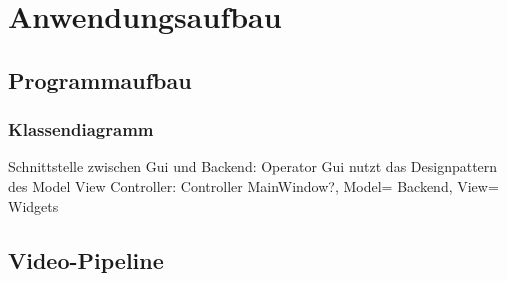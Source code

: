 \chapter{Anwendungsaufbau}
\label{ch:anwendungsaufbau}

\section{Programmaufbau}

\subsection*{Klassendiagramm}


Schnittstelle zwischen Gui und Backend: Operator
Gui nutzt das Designpattern des Model View Controller: Controller MainWindow?, Model= Backend, View= Widgets


\section{Video-Pipeline}

